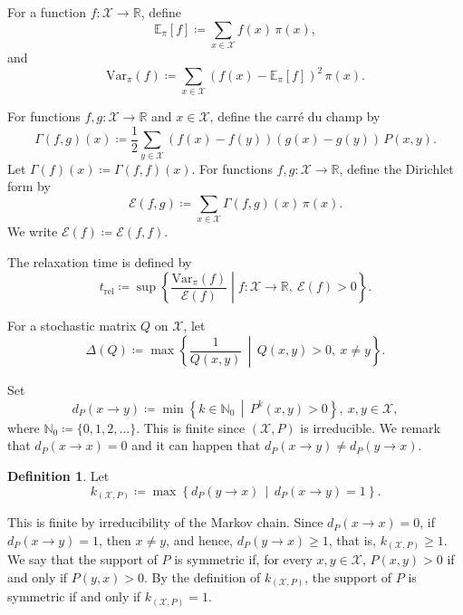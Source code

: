 \documentclass[a4paper, reqno, 11pt]{amsart}
\theoremstyle{definition}
\newtheorem{Def}[Thm]{Definition}
\begin{document}
For a function $f : \mathcal{X} \to \mathbb{R}$, define
\[ \mathbb{E}_\pi [f] \coloneqq  \sum_{x \in \mathcal{X}} f(x)\,\pi(x), \]
and
\begin{equation}\label{eq:def-var} 
\mathrm{Var}_\pi (f) \coloneqq  \sum_{x \in \mathcal{X}} \left(f(x) - \mathbb{E}_\pi[f]\right)^2 \,\pi(x). 
\end{equation} 

For functions $f,g : \mathcal{X} \to \mathbb{R}$ and $x \in \mathcal{X}$, define the carr\'e du champ by 
\[ \Gamma(f,g)(x) \coloneqq  \frac{1}{2}  \sum_{y \in \mathcal{X}} \left(f(x)-f(y)\right)\left(g(x)-g(y)\right)\,P(x,y). \]
Let $\Gamma(f)(x) \coloneqq  \Gamma(f,f)(x)$. 
For functions $f, g : \mathcal{X} \to \mathbb{R}$, define the Dirichlet form by 
\[ \mathcal{E}(f,g) \coloneqq  \sum_{x \in \mathcal{X}} \Gamma(f,g)(x)\,\pi(x). \]
We write $\mathcal{E}(f) \coloneqq  \mathcal{E}(f,f)$.

The relaxation time is defined by
\begin{equation}\label{eq:def-relax} 
t_{\mathrm{rel}} \coloneqq  \sup \left\{ \frac{\mathrm{Var}_\pi(f)}{\mathcal{E}(f)} \middle| f : \mathcal{X} \to \mathbb{R},\ \mathcal{E}(f) > 0 \right\}. 
\end{equation}

For a stochastic matrix $Q$ on $\mathcal{X}$, let 
\[ \Delta(Q) \coloneqq \max\left\{\frac{1}{Q(x,y)} \, \middle| \,  Q(x,y) > 0, \ x \ne y \right\}. \]

Set 
\[ d_{P} (x \to y) \coloneqq \min\left\{k \in \mathbb{N}_0 \,\middle|\, P^k(x,y) > 0 \right\}, \  x, y \in \mathcal{X}, \]
where $\mathbb{N}_0 \coloneqq \{0, 1, 2, \dots\}$.
This is finite since $(\mathcal{X},P)$ is irreducible.
We remark that $d_{P} (x \to x) = 0$ and it can happen that $d_{P} (x \to y) \ne d_{P} (y \to x)$. 

\begin{Def}\label{def:k}
Let
\[ k_{(\mathcal{X}, P)} \coloneqq \max\left\{d_{P}(y \to x)\,\middle|\, d_{P}(x \to y) = 1\right\}. \]
\end{Def}

This is finite by irreducibility of the Markov chain.
Since $d_P (x\to x)=0$, if $d_{P}(x\to y)=1$, then $x\ne y$, and hence,
$d_{P} (y\to x)\ge 1$, that is, $k_{(\mathcal{X}, P)}\ge 1$.
We say that the support of $P$ is symmetric if, for every $x, y \in \mathcal{X}$, $P(x,y) > 0$ if and only if $P(y,x) > 0$.
By the definition of $k_{(\mathcal{X}, P)}$, the support of $P$ is symmetric if and only if $k_{(\mathcal{X}, P)} = 1$.
\end{document}
